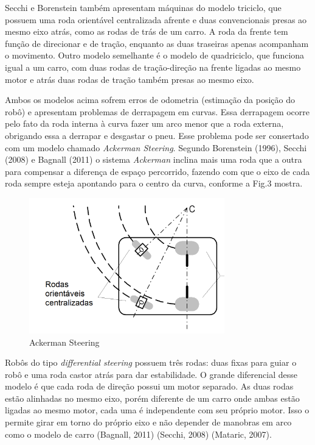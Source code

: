 Secchi e Borenstein também apresentam máquinas do modelo triciclo, que possuem uma roda orientável centralizada afrente e duas convencionais presas ao mesmo eixo atrás, como as rodas de trás de um carro. A roda da frente tem função de direcionar e de tração, enquanto as duas traseiras apenas acompanham o movimento. Outro modelo semelhante é o modelo de quadriciclo, que funciona igual a um carro, com duas rodas de tração-direção na frente ligadas ao mesmo motor e atrás duas rodas de tração também presas ao mesmo eixo. 

Ambos os modelos acima sofrem erros de odometria (estimação da posição do robô) e apresentam problemas de derrapagem em curvas. Essa derrapagem ocorre pelo fato da roda interna à curva fazer um arco menor que a roda externa, obrigando essa a derrapar e desgastar o pneu. Esse problema pode ser consertado com um modelo chamado \textit{Ackerman Steering}. Segundo Borenstein (1996), Secchi (2008) e Bagnall (2011) o sistema \textit{Ackerman} inclina mais uma roda que a outra para compensar a diferença de espaço percorrido, fazendo com que o eixo de cada roda sempre esteja apontando para o centro da curva, conforme a Fig.3 mostra.

\begin{figure}[h]
	\centering
	\label{fig03}
		\includegraphics[keepaspectratio=true,scale=1]{figuras/2ackerman.png}
	\caption{Ackerman Steering}
\end{figure}

Robôs do tipo \textit{differential steering} possuem três rodas: duas fixas para guiar o robô e uma roda castor atrás para dar estabilidade. O grande diferencial desse modelo é que cada roda de direção possui um motor separado. As duas rodas estão alinhadas no mesmo eixo, porém diferente de um carro onde ambas estão ligadas ao mesmo motor, cada uma é independente com seu próprio motor. Isso o permite girar em torno do próprio eixo e não depender de manobras em arco como o modelo de carro (Bagnall, 2011) (Secchi, 2008) (Mataric, 2007).

